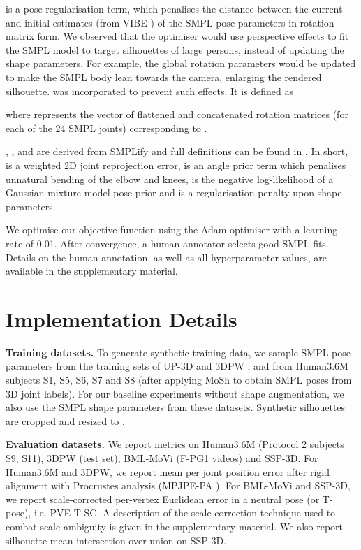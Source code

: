 \documentclass{bmvc2k}
\begin{document}
 is a pose regularisation term, which penalises the  distance between the current and initial estimates (from VIBE \cite{kocabas2019vibe}) of the SMPL pose parameters in rotation matrix form. We observed that the optimiser would use perspective effects to fit the SMPL model to target silhouettes of large persons, instead of updating the shape parameters. For example, the global rotation parameters would be updated to make the SMPL body lean towards the camera, enlarging the rendered silhouette.  was incorporated to prevent such effects. It is defined as 
\vspace{-0.25cm}

where  represents the vector of flattened and concatenated rotation matrices (for each of the 24 SMPL joints) corresponding to . 

, ,  and  are derived from SMPLify and full definitions can be found in \cite{Bogo:ECCV:2016}. In short,  is a weighted 2D joint reprojection error,  is an angle prior term which penalises unnatural bending of the elbow and knees,  is the negative log-likelihood of a Gaussian mixture model pose prior and  is a  regularisation penalty upon shape parameters. 

We optimise our objective function using the Adam \cite{kingma2014adam} optimiser with a learning rate of 0.01. After convergence, a human annotator selects good SMPL fits. Details on the human annotation, as well as all hyperparameter values, are available in the supplementary material.

\section{Implementation Details}
\textbf{Training datasets.} To generate synthetic training data, we sample SMPL pose parameters from the training sets of UP-3D \cite{Lassner:UP:2017} and 3DPW \cite{vonMarcard2018}, and from Human3.6M \cite{h36m_pami} subjects S1, S5, S6, S7 and S8 (after applying MoSh \cite{Loper:SIGASIA:2014} to obtain SMPL poses from 3D joint labels). For our baseline experiments without shape augmentation, we also use the SMPL shape parameters from these datasets. Synthetic silhouettes are cropped and resized to .

\noindent \textbf{Evaluation datasets.} We report metrics on Human3.6M (Protocol 2 \cite{hmrKanazawa17} subjects S9, S11), 3DPW (test set), BML-MoVi \cite{movi2020} (F-PG1 videos) and SSP-3D. For Human3.6M and 3DPW, we report mean per joint position error after rigid alignment with Procrustes analysis (MPJPE-PA \cite{mono-3dhp2017}). For BML-MoVi and SSP-3D, we report scale-corrected per-vertex Euclidean error in a neutral pose (or T-pose), i.e. PVE-T-SC. A description of the scale-correction technique used to combat scale ambiguity is given in the supplementary material. We also report silhouette mean intersection-over-union on SSP-3D.
\end{document}
